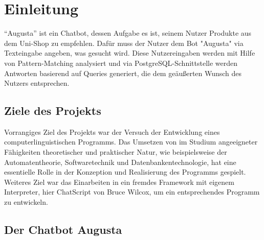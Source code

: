 \chapter{Einleitung}
\label{sec:Einleitung}

"`Augusta"' ist ein Chatbot, dessen Aufgabe es ist, seinem Nutzer Produkte aus dem Uni-Shop zu empfehlen. Dafür muss der Nutzer dem Bot "Augusta" via Texteingabe angeben, was gesucht wird. Diese Nutzereingaben werden mit Hilfe von Pattern-Matching analysiert und via PostgreSQL-Schnittstelle werden Antworten basierend auf Queries generiert, die dem geäußerten Wunsch des Nutzers entsprechen. 


\section{Ziele des Projekts}
\label{sec:ZielDesProjekts}

Vorrangiges Ziel des Projekts war der Versuch der Entwicklung eines computerlinguistischen Programms. Das Umsetzen von im Studium angeeigneter Fähigkeiten theoretischer und praktischer Natur, wie beispielsweise der Automatentheorie, Softwaretechnik und Datenbankentechnologie, hat eine essentielle Rolle in der Konzeption und Realisierung des Programms gespielt. Weiteres Ziel war das Einarbeiten in ein fremdes Framework mit eigenem Interpreter, hier ChatScript \citep{chatscript2019} von Bruce Wilcox, um ein entsprechendes Programm zu entwickeln.\\


\section{Der Chatbot Augusta}
\label{sec:Augusta}

